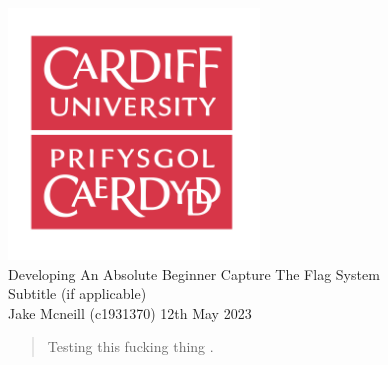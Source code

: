 \documentclass{article}
\begin{document}
	\begin{titlepage}
		\centering
		\includegraphics[width=0.5\textwidth]{images/cardiff-logo.png}
		\vspace{2cm}
		{\Huge \\Developing An Absolute Beginner Capture The Flag System}
		\vspace{1cm}
		{\LARGE \\Subtitle (if applicable)}
		\vspace{3cm}
		{\Large \\Jake Mcneill (c1931370)}
		\vfill
		{\large 12th May 2023}
	\end{titlepage}

	\begin{abstract}
		\centering
		Testing this fucking thing \cite{turing1950computing}.
	\end{abstract}

	
	
\end{document}
